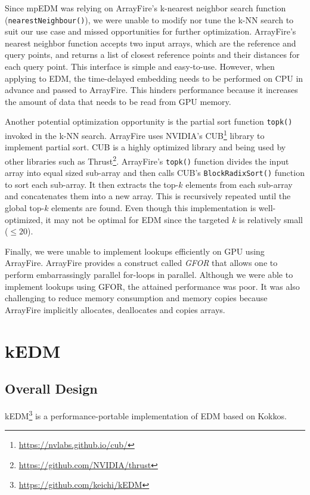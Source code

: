 \documentclass[conference]{IEEEtran}
\begin{document}
Since mpEDM was relying on ArrayFire's k-nearest neighbor search function
(\texttt{nearestNeighbour()}), we were unable to modify nor tune the k-NN
search to suit our use case and missed opportunities for further optimization.
ArrayFire's nearest neighbor function accepts two input arrays, which are the
reference and query points, and returns a list of closest reference points and
their distances for each query point. This interface is simple and
easy-to-use. However, when applying to EDM, the time-delayed embedding needs
to be performed on CPU in advance and passed to ArrayFire. This hinders
performance because it increases the amount of data that needs to be read from
GPU memory.

Another potential optimization opportunity is the partial sort function
\texttt{topk()} invoked in the k-NN search. ArrayFire uses NVIDIA's
CUB\footnote{\url{https://nvlabs.github.io/cub/}} library to implement partial
sort. CUB is a highly optimized library and being used by other libraries such
as Thrust\footnote{\url{https://github.com/NVIDIA/thrust}}. ArrayFire's
\texttt{topk()} function divides the input array into equal sized sub-array
and then calls CUB's \texttt{BlockRadixSort()} function to sort each
sub-array. It then extracts the top-$k$ elements from each sub-array and
concatenates them into a new array. This is recursively repeated until the
global top-$k$ elements are found. Even though this implementation is
well-optimized, it may not be optimal for EDM since the targeted $k$ is
relatively small ($\leq 20$).

Finally, we were unable to implement lookups efficiently on GPU using
ArrayFire. ArrayFire provides a construct called \textit{GFOR} that allows one
to perform embarrassingly parallel for-loops in parallel. Although we were
able to implement lookups using GFOR, the attained performance was poor. It
was also challenging to reduce memory consumption and memory copies because
ArrayFire implicitly allocates, deallocates and copies arrays.

\section{kEDM}

\subsection{Overall Design}

kEDM\footnote{\url{https://github.com/keichi/kEDM}} is a performance-portable
implementation of EDM based on Kokkos.
\end{document}
